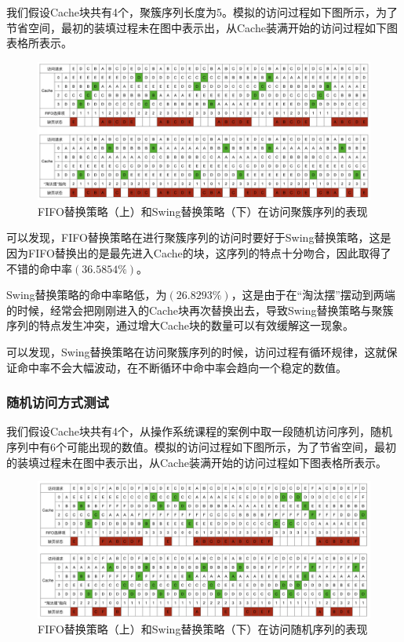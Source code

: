 \documentclass{article}
\begin{document}
我们假设Cache块共有4个，聚簇序列长度为5。模拟的访问过程如下图所示，为了节省空间，最初的装填过程未在图中表示出，从Cache装满开始的访问过程如下图表格所表示。

\begin{figure}[H]
    \centering
    \includegraphics[width=1\textwidth]{pic3.png}
    \caption{FIFO替换策略（上）和Swing替换策略（下）在访问聚簇序列的表现}
\end{figure}

可以发现，FIFO替换策略在进行聚簇序列的访问时要好于Swing替换策略，这是因为FIFO替换出的是最先进入Cache的块，这序列的特点十分吻合，因此取得了不错的命中率$(36.5854\%)$。

Swing替换策略的命中率略低，为$(26.8293\%)$，这是由于在“淘汰摆”摆动到两端的时候，经常会把刚刚进入的Cache块再次替换出去，导致Swing替换策略与聚簇序列的特点发生冲突，通过增大Cache块的数量可以有效缓解这一现象。

可以发现，Swing替换策略在访问聚簇序列的时候，访问过程有循环规律，这就保证命中率不会大幅波动，在不断循环中命中率会趋向一个稳定的数值。

\subsubsection{随机访问方式测试}

我们假设Cache块共有4个，从操作系统课程的案例中取一段随机访问序列，随机序列中有6个可能出现的数值。模拟的访问过程如下图所示，为了节省空间，最初的装填过程未在图中表示出，从Cache装满开始的访问过程如下图表格所表示。

\begin{figure}[H]
    \centering
    \includegraphics[width=1\textwidth]{pic4.png}
    \caption{FIFO替换策略（上）和Swing替换策略（下）在访问随机序列的表现}
\end{figure}
\end{document}
